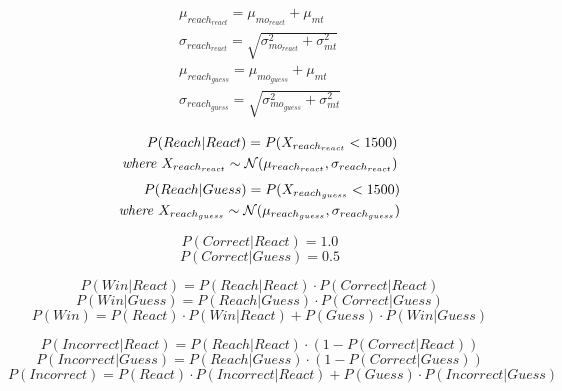 \documentclass[12pt,letterpaper]{article}
\begin{document}
\begin{align}
    \mu_{reach_{react}} =\mu_{mo_{react}} + \mu_{mt}                      \\
    \sigma_{reach_{react}} = \sqrt{\sigma_{mo_{react}}^2 + \sigma_{mt}^2} \\
    \mu_{reach_{guess}} =\mu_{mo_{guess}} + \mu_{mt}                      \\
    \sigma_{reach_{guess}} = \sqrt{\sigma_{mo_{guess}}^2 + \sigma_{mt}^2}
\end{align}

\begin{align}
    P(Reach|React) = P(X_{reach_{react}} < 1500) \\
    \text{\emph{where} } X_{reach_{react}} \sim \mathcal{N}(\mu_{reach_{react}}, \sigma_{reach_{react}}) \nonumber
\end{align}
\begin{align}
    P(Reach|Guess) = P(X_{reach_{guess}} < 1500) \\
    \text{\emph{where} } X_{reach_{guess}} \sim \mathcal{N}(\mu_{reach_{guess}}, \sigma_{reach_{guess}}) \nonumber
\end{align}

\begin{equation}
    P(Correct|React) = 1.0
\end{equation}
\begin{equation}
    P(Correct|Guess) = 0.5
\end{equation}


\begin{equation}
    P(Win|React) = P(Reach|React) \cdot P(Correct|React)
\end{equation}
\begin{equation}
    P(Win|Guess) = P(Reach|Guess) \cdot P(Correct|Guess)
\end{equation}
\begin{equation}
    P(Win) = P(React) \cdot P(Win|React) + P(Guess) \cdot P(Win|Guess) 
\end{equation}

\begin{equation}
    P(Incorrect|React) = P(Reach|React) \cdot (1 - P(Correct|React))
\end{equation}
\begin{equation}
    P(Incorrect|Guess) = P(Reach|Guess) \cdot (1 - P(Correct|Guess))
\end{equation}
\begin{equation}
    P(Incorrect) = P(React) \cdot P(Incorrect|React) + P(Guess) \cdot P(Incorrect|Guess) 
\end{equation}
\end{document}
